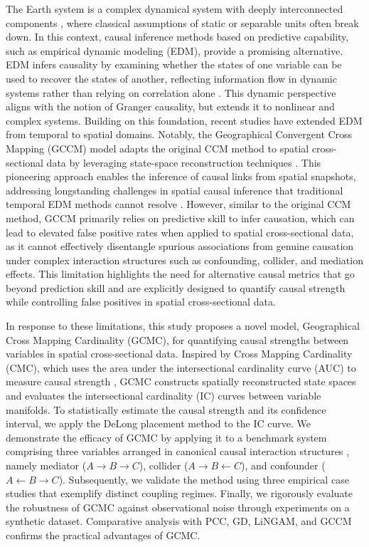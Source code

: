 \documentclass[authoryear,preprint,review,12pt]{elsarticle}
\begin{document}
The Earth system is a complex dynamical system with deeply interconnected components \citep{runge2019esstsc,runge2023tsc}, where classical assumptions of static or separable units often break down. In this context, causal inference methods based on predictive capability, such as empirical dynamic modeling (EDM), provide a promising alternative. EDM infers causality by examining whether the states of one variable can be used to recover the states of another, reflecting information flow in dynamic systems rather than relying on correlation alone \citep{sugihara2012ccm,leng2020pcm,tao2023cmc}. This dynamic perspective aligns with the notion of Granger causality, but extends it to nonlinear and complex systems. Building on this foundation, recent studies have extended EDM from temporal to spatial domains. Notably, the Geographical Convergent Cross Mapping (GCCM) model adapts the original CCM method \citep{sugihara2012ccm} to spatial cross-sectional data by leveraging state-space reconstruction techniques \citep{lorenz1969ssr,Takens1981embedding,Mane1981embedding}. This pioneering approach enables the inference of causal links from spatial snapshots, addressing longstanding challenges in spatial causal inference that traditional temporal EDM methods cannot resolve \citep{gao2022tscess,gao2023gccm}. However, similar to the original CCM method, GCCM primarily relies on predictive skill to infer causation, which can lead to elevated false positive rates when applied to spatial cross-sectional data, as it cannot effectively disentangle spurious associations from genuine causation under complex interaction structures such as confounding, collider, and mediation effects. This limitation highlights the need for alternative causal metrics that go beyond prediction skill and are explicitly designed to quantify causal strength while controlling false positives in spatial cross-sectional data.

In response to these limitations, this study proposes a novel model, Geographical Cross Mapping Cardinality (GCMC), for quantifying causal strengths between variables in spatial cross-sectional data. Inspired by Cross Mapping Cardinality (CMC), which uses the area under the intersectional cardinality curve (AUC) to measure causal strength \citep{tao2023cmc}, GCMC constructs spatially reconstructed state spaces and evaluates the intersectional cardinality (IC) curves between variable manifolds. To statistically estimate the causal strength and its confidence interval, we apply the DeLong placement method \citep{delong1988,sun2014delongfi} to the IC curve. We demonstrate the efficacy of GCMC by applying it to a benchmark system comprising three variables arranged in canonical causal interaction structures \citep{sanchez2024surd}, namely mediator (\(A \rightarrow B \rightarrow C\)), collider (\(A \rightarrow B \leftarrow C\)), and confounder (\(A \leftarrow B \rightarrow C\)). Subsequently, we validate the method using three empirical case studies that exemplify distinct coupling regimes. Finally, we rigorously evaluate the robustness of GCMC against observational noise through experiments on a synthetic dataset. Comparative analysis with PCC, GD, LiNGAM, and GCCM confirms the practical advantages of GCMC.
\end{document}
